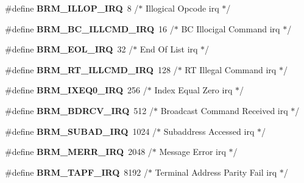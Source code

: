 \begin{DoxyCompactItemize}
\#define {\bfseries B\+R\+M\+\_\+\+I\+L\+L\+O\+P\+\_\+\+I\+RQ}~8                    /$\ast$ Illogical Opcode irq $\ast$/
\item 
\mbox{\label{group__B1553BRM_ga3f261b42aab8c3333fe8f3ef28ca06b3}} 
\#define {\bfseries B\+R\+M\+\_\+\+B\+C\+\_\+\+I\+L\+L\+C\+M\+D\+\_\+\+I\+RQ}~16                   /$\ast$ BC Illocigal Command irq $\ast$/
\item 
\mbox{\label{group__B1553BRM_ga55b5092c78d928ee349e37c77ee5fc00}} 
\#define {\bfseries B\+R\+M\+\_\+\+E\+O\+L\+\_\+\+I\+RQ}~32                   /$\ast$ End Of List irq $\ast$/
\item 
\mbox{\label{group__B1553BRM_ga6901443f952793432ccc02ab1f5e1dc3}} 
\#define {\bfseries B\+R\+M\+\_\+\+R\+T\+\_\+\+I\+L\+L\+C\+M\+D\+\_\+\+I\+RQ}~128                  /$\ast$ RT Illegal Command irq $\ast$/
\item 
\mbox{\label{group__B1553BRM_ga306f8ca026620484091d38bcfbb797b1}} 
\#define {\bfseries B\+R\+M\+\_\+\+I\+X\+E\+Q0\+\_\+\+I\+RQ}~256                  /$\ast$ Index Equal Zero irq $\ast$/
\item 
\mbox{\label{group__B1553BRM_gad493a4629b93facffa563e454168eb5e}} 
\#define {\bfseries B\+R\+M\+\_\+\+B\+D\+R\+C\+V\+\_\+\+I\+RQ}~512                  /$\ast$ Broadcast Command Received irq $\ast$/
\item 
\mbox{\label{group__B1553BRM_ga675070fa23dc9e58964fbd92f135dca9}} 
\#define {\bfseries B\+R\+M\+\_\+\+S\+U\+B\+A\+D\+\_\+\+I\+RQ}~1024                 /$\ast$ Subaddress Accessed irq $\ast$/
\item 
\mbox{\label{group__B1553BRM_gaa944476d8412743370b155d7ee27698f}} 
\#define {\bfseries B\+R\+M\+\_\+\+M\+E\+R\+R\+\_\+\+I\+RQ}~2048                 /$\ast$ Message Error irq $\ast$/
\item 
\mbox{\label{group__B1553BRM_ga4e8eaf4ff8362d6d4ee9c5347b36413c}} 
\#define {\bfseries B\+R\+M\+\_\+\+T\+A\+P\+F\+\_\+\+I\+RQ}~8192                 /$\ast$ Terminal Address Parity Fail irq $\ast$/
\item 
\mbox{\label{group__B1553BRM_ga290bd86bc43969e328dddedb93054b96}} 

\end{DoxyCompactItemize}
